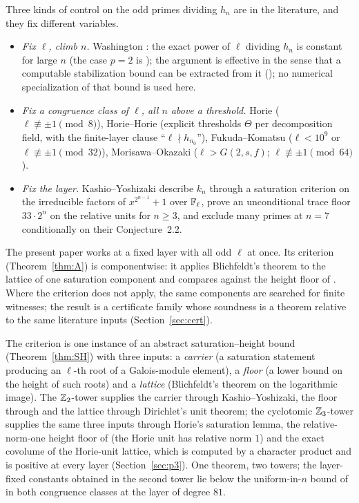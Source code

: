 \documentclass[11pt]{amsart}
\theoremstyle{remark}\newtheorem{remark}[theorem]{Remark}
\theoremstyle{definition}\newtheorem{definition}[theorem]{Definition}
\begin{document}
Three kinds of control on the odd primes dividing $h_n$ are in the literature, and they fix different variables.
\begin{itemize}
\item[(i)] \emph{Fix $\ell$, climb $n$.} Washington \cite{Wa75,Wa78}: the exact power of $\ell$ dividing $h_n$ is constant for large $n$ (the case $p=2$ is \cite{Wa75}); the argument is effective in the sense that a computable stabilization bound can be extracted from it (\cite{Wa78}); no numerical specialization of that bound is used here.
\item[(ii)] \emph{Fix a congruence class of $\ell$, all $n$ above a threshold.} Horie \cite{Ho05,Ho07} ($\ell\not\equiv\pm1\pmod 8$), Horie--Horie \cite{HH09} (explicit thresholds $\Theta$ per decomposition field, with the finite-layer clause ``$\ell\nmid h_{n_0}$''), Fukuda--Komatsu \cite{FK3} ($\ell<10^9$ or $\ell\not\equiv\pm1\pmod{32}$), Morisawa--Okazaki \cite{MO16} ($\ell>G(2,s,f)$; $\ell\not\equiv\pm1\pmod{64}$).
\item[(iii)] \emph{Fix the layer.} Kashio--Yoshizaki \cite{KY} describe $k_n$ through a saturation criterion on the irreducible factors of $x^{2^{n-1}}+1$ over $\mathbb{F}_\ell$, prove an unconditional trace floor $33\cdot2^n$ on the relative units for $n\ge3$, and exclude many primes at $n=7$ conditionally on their Conjecture~2.2.
\end{itemize}
The present paper works at a fixed layer with all odd $\ell$ at once. Its criterion (Theorem~\ref{thm:A}) is componentwise: it applies Blichfeldt's theorem \cite{Bl14} to the lattice of one saturation component and compares against the height floor of \cite{MO16}. Where the criterion does not apply, the same components are searched for finite witnesses; the result is a certificate family whose soundness is a theorem relative to the same literature inputs (Section~\ref{sec:cert}).

The criterion is one instance of an abstract saturation--height bound (Theorem~\ref{thm:SH}) with three inputs: a \emph{carrier} (a saturation statement producing an $\ell$-th root of a Galois-module element), a \emph{floor} (a lower bound on the height of such roots) and a \emph{lattice} (Blichfeldt's theorem on the logarithmic image). The $\mathbb{Z}_2$-tower supplies the carrier through Kashio--Yoshizaki, the floor through \cite{MO16} and the lattice through Dirichlet's unit theorem; the cyclotomic $\mathbb{Z}_3$-tower supplies the same three inputs through Horie's saturation lemma, the relative-norm-one height floor of \cite{MO16} (the Horie unit has relative norm $1$) and the exact covolume of the Horie-unit lattice, which is computed by a character product and is positive at every layer (Section~\ref{sec:p3}). One theorem, two towers; the layer-fixed constants obtained in the second tower lie below the uniform-in-$n$ bound of \cite{MO16} in both congruence classes at the layer of degree $81$.
\end{document}
